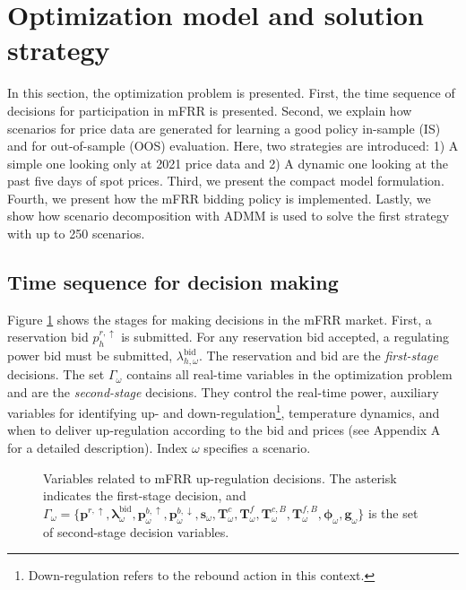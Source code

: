 \section{Optimization model and solution strategy}\label{sec:OptimizationModel}

In this section, the optimization problem is presented. First, the time sequence of decisions for participation in mFRR is presented. Second, we explain how scenarios for price data are generated for learning a good policy in-sample (IS) and for out-of-sample (OOS) evaluation. Here, two strategies are introduced: 1) A simple one looking only at 2021 price data and 2) A dynamic one looking at the past five days of spot prices. Third, we present the compact model formulation. Fourth, we present how the mFRR bidding policy is implemented. Lastly, we show how scenario decomposition with ADMM is used to solve the first strategy with up to 250 scenarios.

\subsection{Time sequence for decision making}

Figure \ref{fig:timeline_mfrr_variables} shows the stages for making decisions in the mFRR market. First, a reservation bid $p_{h}^{r,\uparrow}$ is submitted. For any reservation bid accepted, a regulating power bid must be submitted, $\lambda_{h,\omega}^{\text{bid}}$. The reservation and bid are the \textit{first-stage} decisions. The set $\Gamma_{\omega}$ contains all real-time variables in the optimization problem and are the \textit{second-stage} decisions. They control the real-time power, auxiliary variables for identifying up- and down-regulation\footnote{Down-regulation refers to the rebound action in this context.}, temperature dynamics, and when to deliver up-regulation according to the bid and prices (see Appendix A for a detailed description). Index $\omega$ specifies a scenario.

\begin{figure}[!t]
    \centering
    
    \caption{Variables related to mFRR up-regulation decisions. The asterisk indicates the first-stage decision, and \\ $\Gamma_{\omega} = \{ \bm{p}^{r,\uparrow}, \bm{\lambda}_{\omega}^{\text{bid}}, \bm{p}_{\omega}^{b,\uparrow}, \bm{p}_{\omega}^{b,\downarrow}, \bm{s}_{\omega}, \bm{T}_{\omega}^{c}, \bm{T}_{\omega}^{f}, \bm{T}_{\omega}^{c, B}, \bm{T}_{\omega}^{f,B}, \bm{\phi}_{\omega}, \bm{g}_{\omega} \}$ is the set of second-stage decision variables.}
    \label{fig:timeline_mfrr_variables}
\end{figure}

